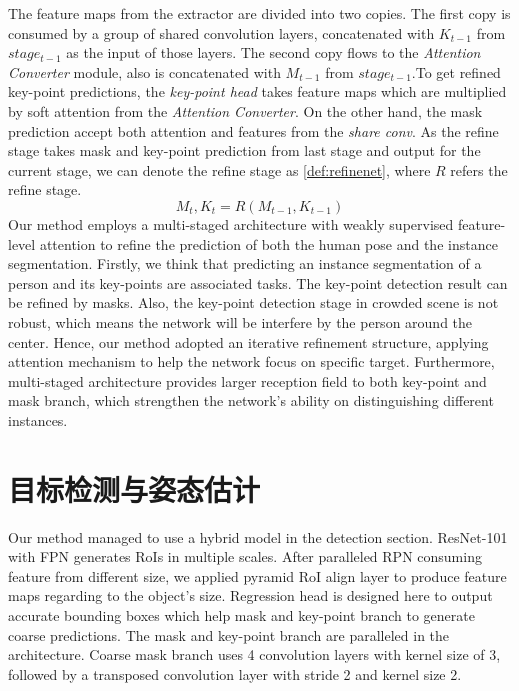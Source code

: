 The feature maps from the extractor are divided into two copies. The first copy is consumed by a group of shared convolution layers, concatenated with $K_{t-1}$ from $stage_{t-1}$ as the input of those layers. The second copy flows to the \textit{Attention Converter} module, also is concatenated with $M_{t-1}$ from $stage_{t-1}$.To get refined key-point predictions, the \textit{key-point head} takes feature maps which are multiplied by soft attention from the \textit{Attention Converter}. On the other hand, the mask prediction accept both attention and features from the \textit{share conv}. As the refine stage takes mask and key-point prediction from last stage and output for the current stage, we can denote the refine stage as \eqref{def:refinenet}, where $R$ refers the refine stage.
\begin{equation}
\label{def:refinenet}
M_t, K_t = R(M_{t-1}, K_{t-1})
\end{equation}
Our method employs a multi-staged architecture with weakly supervised feature-level attention to refine the prediction of both the human pose and the instance segmentation. Firstly, we think that predicting an instance segmentation of a person and its key-points are associated tasks. The key-point detection result can be refined by masks. Also, the key-point detection stage in crowded scene is not robust, which means the network will be interfere by the person around the center. Hence, our method adopted an iterative refinement structure, applying attention mechanism to help the network focus on specific target. Furthermore, multi-staged architecture provides larger reception field to both key-point and mask branch, which strengthen the network's ability on distinguishing different instances.

\section{目标检测与姿态估计}
\label{sec:detectionstage}
Our method managed to use a hybrid model in the detection section. ResNet-101 with FPN generates RoIs in multiple scales. After paralleled RPN consuming feature from different size, we applied pyramid RoI align layer to produce feature maps regarding to the object's size. Regression head is designed here to output accurate bounding boxes which help mask and key-point branch to generate coarse predictions. The mask and key-point branch are paralleled in the architecture. Coarse mask branch uses 4 convolution layers with kernel size of 3, followed by a transposed convolution layer with stride 2 and kernel size 2.

